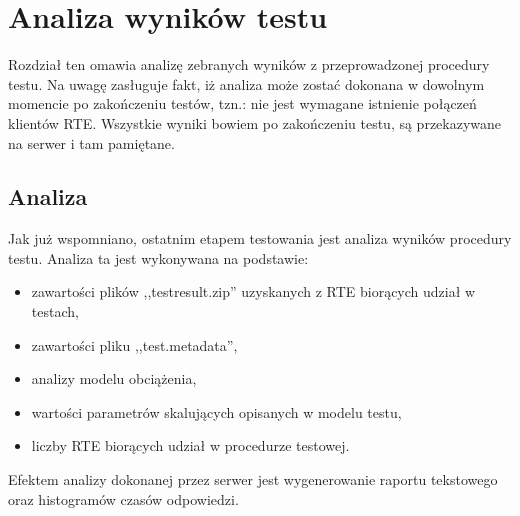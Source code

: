 \chapter{Analiza wyników testu}\label{chap:testresultanalysis}
Rozdział ten omawia analizę zebranych wyników z przeprowadzonej procedury testu.
Na uwagę zasługuje fakt, iż analiza może zostać dokonana w dowolnym momencie po zakończeniu testów,
tzn.: nie jest wymagane istnienie połączeń klientów RTE. Wszystkie wyniki bowiem po zakończeniu testu,
są przekazywane na serwer i tam pamiętane.
\section{Analiza}
Jak już wspomniano, ostatnim etapem testowania jest analiza wyników procedury testu. 
Analiza ta jest wykonywana na podstawie:
\begin{itemize}
\item zawartości plików ,,testresult.zip'' uzyskanych z RTE biorących udział w testach,
\item zawartości pliku ,,test.metadata'',
\item analizy modelu obciążenia,
\item wartości parametrów skalujących opisanych w modelu testu,
\item liczby RTE biorących udział w procedurze testowej.
\end{itemize}
Efektem analizy dokonanej przez serwer jest wygenerowanie raportu tekstowego
oraz histogramów czasów odpowiedzi.
